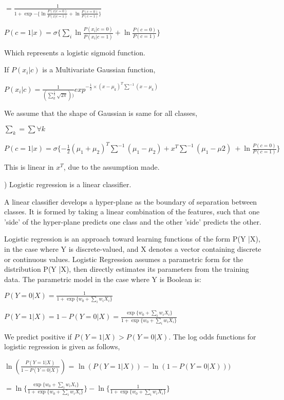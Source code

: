 \documentclass{exam}
\begin{document}
\begin{questions}
$=\frac{1}{1+ \exp{-\{\ln{\frac{P( x | c = 0)}{P( x | c = 1)} + \ln{\frac{P(c = 0)}{P(c = 1)}}}}\}}$


$P(c = 1 | x ) = \sigma\{\sum_{i}{ \ln{\frac{P( x_{i} | c = 0)}{P( x_{i} | c = 1)} + \ln{\frac{P(c = 0)}{P(c = 1)}}}}\}$

Which represents a logistic sigmoid function.

If $P(x_{i} | c)$ is a Multivariate Gaussian function,

$P(x_{i} | c) = \frac{1}{(\sum_{k}^{\frac{1}{2}} \sqrt{2\pi}))} exp^{-\frac{1}{2} \times (x - \mu_{k})^{T} \sum^{-1}{(x - \mu_{k})}}$

We assume that the shape of Gaussian is same for all classes,

$\sum_{k} = \sum \forall k$

$P(c=1 | x) = \sigma\{ -\frac{1}{2}{(\mu_{1} + \mu_{2})^{T}} \sum^{-1}{(\mu_{1} - \mu_{2})} + x^{T}\sum^{-1}(\mu_{1} - \mu{2})\ + \ln{\frac{P(c = 0)}{P(c = 1)}}\} $

This is linear in $x^{T}$, due to the assumption made.



) Logistic regression is a linear classifier.

A linear classifier develops a hyper-plane as the boundary of separation between classes. It is formed by taking a linear combination of the features, such that one 'side' of the hyper-plane predicts one class and the other 'side' predicts the other. 

Logistic regression is an approach toward learning functions of the form P(Y |X), in the case where Y is discrete-valued, and X denotes a vector containing discrete or continuous values. Logistic Regression assumes a parametric form for the distribution P(Y |X), then directly estimates its parameters from the training data. The parametric model in the case where Y is Boolean is:

$P(Y=0|X) = \frac{1}{1 + \exp{\{w_{0} + \sum_{i} w_{i}X_{i}\}}}$

$P(Y=1|X) = 1 - P(Y=0|X) =\frac{\exp{\{w_{0} + \sum_{i} w_{i}X_{i}\}}}{1 + \exp{\{w_{0} + \sum_{i} w_{i}X_{i}\}}}$

We predict positive if $P(Y=1|X) > {P(Y=0|X)}$. The log odds functions for logistic regression is given as follows,

$\ln(\frac{P(Y=1 | X)}{1 - P(Y=0 | X)})$
= $\ln(P(Y=1 | X)) - \ln{(1 - P(Y=0 | X))})$

$= \ln{\{ \frac{\exp{\{w_{0} + \sum_{i} w_{i}X_{i}\}}}{1 + \exp{\{w_{0} + \sum_{i} w_{i}X_{i}\}}} \}} - \ln{ \{ \frac{1}{1 + \exp{\{w_{0} + \sum_{i} w_{i}X_{i}\}}} \} }$


\end{questions}
\end{document}
